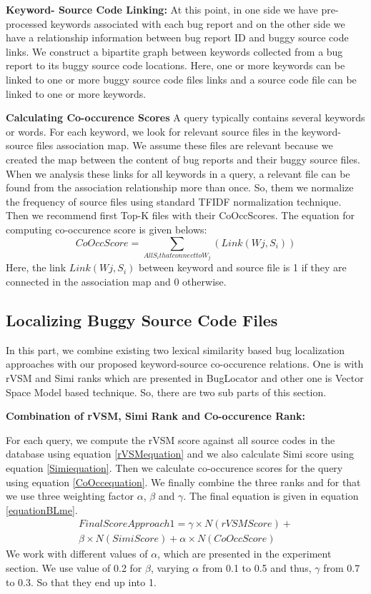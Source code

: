 \documentclass[conference]{IEEEtran}
\begin{document}
\textbf{Keyword- Source Code Linking:}
At this point, in one side we have pre-processed keywords associated with each bug report and on the other side we have a relationship information between bug report ID and buggy source code links. We construct a bipartite graph between keywords collected from a bug report to its buggy source code locations. Here, one or more keywords can be linked to one or more buggy source code files links and a source code file can be linked to one or more keywords.

\textbf{Calculating Co-occurence Scores}
A query typically contains several keywords or words. For each keyword, we look for relevant source files in the keyword-source files association map. We assume these files are relevant because we created the map between the content of bug reports and their buggy source files. When we analysis these links for all keywords in a query, a relevant file can be found from the association relationship more than once. So, them we normalize the frequency of source files using standard TFIDF normalization technique. Then we recommend first Top-K files with their CoOccScores. The equation for computing co-occurence score is given belows:
\begin{equation}\label{CoOccequation}
CoOccScore=\sum_{All S_{i} that connect to W_{j}}(Link(W{j},S_{i}))
\end{equation}
Here, the link $Link(W{j},S_{i})$ between keyword and source file is 1 if they are connected in the association map and 0 otherwise.


\subsection{Localizing Buggy Source Code Files} 
In this part, we combine existing two lexical similarity based bug localization approaches with our proposed keyword-source co-occurence relations. One is with rVSM and Simi ranks which are presented in BugLocator and other one is Vector Space Model based technique. So, there are two sub parts of this section.

\textbf{Combination of rVSM, Simi Rank and Co-occurence Rank:}

For each query, we compute the rVSM score against all source codes in the database using equation \ref{rVSMequation} and we also calculate Simi score using equation \ref{Simiequation}. Then we calculate co-occurence scores for the query using equation \ref{CoOccequation}.
We finally combine the three ranks and for that we use three weighting factor {$\alpha$}, $\beta$ and $\gamma$.
The final equation is given in equation \ref{equationBLme}.
\begin{multline}\label{equationBLme}
FinalScoreApproach1=\gamma \times N(rVSMScore)+
\\ \beta \times N(SimiScore) + \alpha \times N(CoOccScore)
\end{multline}
We work with different values of $\alpha$, which are presented in the experiment section. We use value of 0.2 for $\beta$, varying $\alpha$ from 0.1 to 0.5 and thus, $\gamma$ from 0.7 to 0.3. So that they end up into 1.
\end{document}
